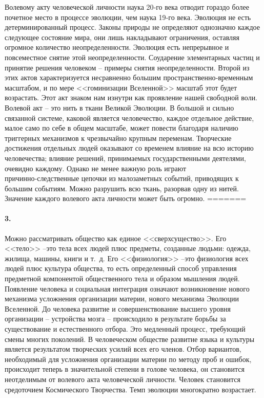 \documentclass{book}
\begin{document}
Волевому акту человеческой личности наука 20‑го века отводит гораздо более почетное место в процессе эволюции, чем наука 19‑го века. Эволюция не есть детерминированный процесс. Законы природы не определяют однозначно каждое следующее состояние мира, они лишь накладывают ограничения, оставляя огромное количество неопределенности. Эволюция есть непрерывное и повсеместное снятие этой неопределенности. Соударение элементарных частиц и принятие решения человеком -- примеры снятия неопределенности. Второй из этих актов характеризуется несравненно большим пространственно‑временным масштабом, и по мере <<гоминизации Вселенной>> масштаб этот будет возрастать. Этот акт знаком нам изнутри как проявление нашей свободной воли. Волевой акт -- это нить в ткани Великой Эволюции. В большой и сильно связанной системе, каковой является человечество, каждое отдельное действие, малое само по себе в общем масштабе, может повести благодаря наличию триггерных механизмов к чрезвычайно крупным переменам. Творческие достижения отдельных людей оказывают со временем влияние на всю историю человечества; влияние решений, принимаемых государственными деятелями, очевидно каждому. Однако не менее важную роль играют причинно‑следственные цепочки из малозаметных событий, приводящих к большим событиям. Можно разрушить всю ткань, разорвав одну из нитей. Значение каждого волевого акта личности может быть огромно.
=======
\paragraph{3.} Можно рассматривать общество как единое <<сверхсущество>>. Его <<тело>> --это тела всех людей плюс предметы, созданные людьми: одежда, жилища, машины, книги и т.~д. Его <<физиология>> --это физиология всех людей плюс культура  общества, то есть определенный способ управления предметной компонентой общественного тела и образом мышления людей. Появление человека и социальная интеграция означают возникновение нового механизма усложнения организации материи, нового механизма Эволюции Вселенной. До человека развитие и совершенствование высшего уровня организации -- устройства мозга -- происходило в результате борьбы за существование и естественного отбора. Это медленный процесс, требующий смены многих поколений. В человеческом обществе развитие языка и культуры является результатом творческих усилий всех его членов. Отбор вариантов, необходимый для усложнения организации материи по методу проб и ошибок, происходит теперь в значительной степени в голове человека, он становится неотделимым от волевого 
акта человеческой личности. Человек становится средоточием Космического Творчества. Темп эволюции многократно возрастает.
\end{document}
